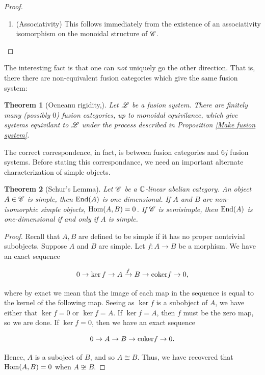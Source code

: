 \documentclass{article}
\newtheorem{theorem}{Theorem}[section]
\theoremstyle{definition}
\numberwithin{figure}{section}
\begin{document}
\begin{enumerate}[\thesection .1.]
\begin{proof}
\begin{enumerate}
\item (Associativity) This follows immediately from the existence of an associativity isomorphism on the monoidal structure of $\mathscr{C}$.
\end{enumerate}
\end{proof}

The interesting fact is that one can \textit{not} uniquely go the other direction. That is, there there are non-equivalent fusion categories which give the same fusion system:

\begin{theorem}[Ocneanu rigidity,\cite{gainutdinov2023davydov}] Let $\mathscr{L}$ be a fusion system. There are finitely many (possibly $0$) fusion categories, up to monoidal equivilance, which give systems equivilant to $\mathscr{L}$ under the process described in Proposition \ref{Make fusion system}.
\end{theorem}

The correct correspondence, in fact, is between fusion categories and $6j$ fusion systems. Before stating this correspondance, we need an important alternate characterization of simple objects.

\begin{theorem}[Schur's Lemma]\label{Schurs Lemma} Let $\mathscr{C}$ be a $\mathbb{C}$-linear abelian category. An object $A\in \mathscr{C}$ is simple, then $\mathrm{End}(A)$ is one dimensional. If $A$ and $B$ are non-isomorphic simple objects, $\mathrm{Hom}(A,B)=0$. If $\mathscr{C}$ is semisimple, then $\mathrm{End}(A)$ is one-dimensional if and only if $A$ is simple.
\end{theorem}
\begin{proof} Recall that $A,B$ are defined to be simple if it has no proper nontrivial subobjects. Suppose $A$ and $B$ are simple. Let $f:A\to B$ be a morphism. We have an exact sequence

$$0\to \ker f \to A\xrightarrow{f} B\to \mathrm{coker} f\to 0,$$

where by exact we mean that the image of each map in the sequence is equal to the kernel of the following map. Seeing as $\ker f$ is a subobject of $A$, we have either that $\ker f= 0$ or $\ker f = A$. If $\ker f = A$, then $f$ must be the zero map, so we are done. If $\ker f =0$, then we have an exact sequence

$$0\to A\to B\to \mathrm{coker} f\to 0.$$

Hence, $A$ is a suboject of $B$, and so $A\cong B$. Thus, we have recovered that $\mathrm{Hom}(A,B)=0$ when $A\not\cong B$.


\end{proof}
\end{enumerate}
\end{document}

